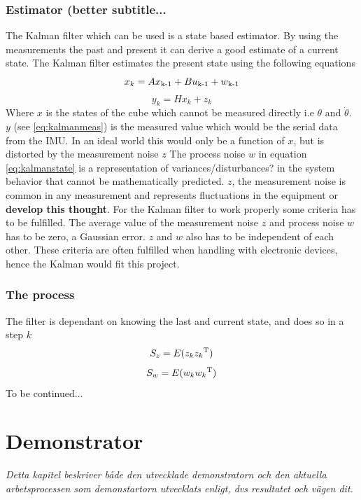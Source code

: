 \documentclass[a4paper,11pt]{kth-mag}
\begin{document}
\subsection{Estimator (better subtitle...}
The Kalman filter which can be used is a state based estimator. By using the measurements the past and present it can derive a good estimate of a current state. The Kalman filter estimates the present state using the following equations
\begin{equation}\label{eq:kalmanstate}
x_k = Ax\textsubscript{k-1}+Bu\textsubscript{k-1}+w\textsubscript{k-1}
\end{equation}
\begin{equation} \label{eq:kalmanmeas}
y_k = Hx_k + z_k
\end{equation}
Where $x$ is the states of the cube which cannot be measured directly i.e $\theta$ and   $\dot{\theta}$. $y$ (see \eqref{eq:kalmanmeas}) is the measured value which would be the serial data from the IMU. In an ideal world this would only be a function of $x$, but is distorted by the measurement noise $z$
The process noise $w$ in equation \eqref{eq:kalmanstate} is a representation of variances/disturbances? in the system behavior that cannot be mathematically predicted. $z$, the measurement noise is common in any measurement and represents fluctuations in the equipment or \textbf{develop this thought}. 
For the Kalman filter to work properly some criteria has to be fulfilled. The average value of the measurement noise $z$ and process noise $w$ has to be zero, a Gaussian error. $z$ and $w$ also has to be independent of  each other. These criteria are often fulfilled when handling with electronic devices, hence the Kalman would fit this project.
\subsection{The process}
The filter is dependant on knowing the last and current state, and does so in a step $k$ 
\begin{equation} \label{eq:covariance measurement noise}
S_z = E(z_k z_k \textsuperscript{T} )
\end{equation}
\begin{equation} \label{eq:covariance process noise}
S_w = E(w_k w_k \textsuperscript{T})
\end{equation}
To be continued...



 
\chapter{Demonstrator}
\emph{Detta kapitel beskriver både den utvecklade demonstratorn och den aktuella arbetsprocessen som demonstartorn utvecklats enligt, dvs resultatet och vägen dit.}
\end{document}
